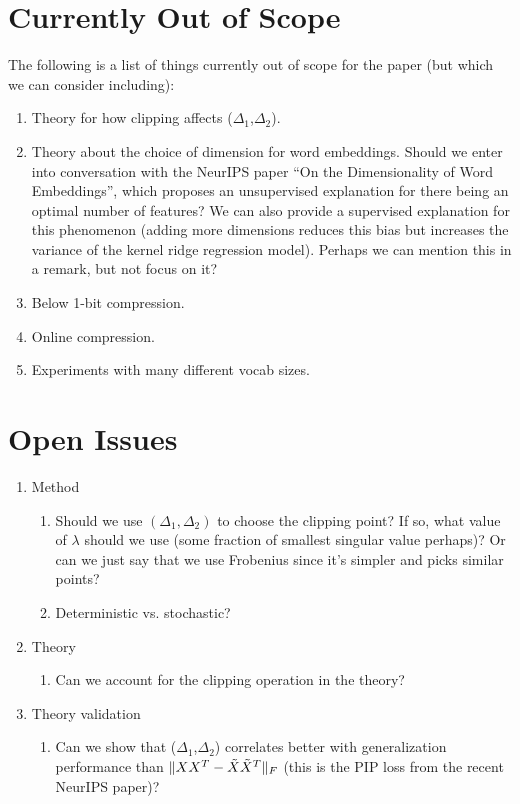 \documentclass[12pt]{article}
\begin{document}
\section{Currently Out of Scope}
The following is a list of things currently out of scope for the paper (but which we can consider including):
\begin{enumerate}
	\item Theory for how clipping affects ($\Delta_1$,$\Delta_2$).
	\item Theory about the choice of dimension for word embeddings. Should we enter into conversation with the NeurIPS paper ``On the Dimensionality of Word Embeddings'', which proposes an unsupervised explanation for there being an optimal number of features?
	We can also provide a supervised explanation for this phenomenon (adding more dimensions reduces this bias but increases the variance of the kernel ridge regression model).  Perhaps we can mention this in a remark, but not focus on it?
	\item Below 1-bit compression.
	\item Online compression.
	\item Experiments with many different vocab sizes.
\end{enumerate}

\section{Open Issues}
\begin{enumerate}
	\item Method
	\begin{enumerate}
		\item Should we use $(\Delta_1,\Delta_2)$ to choose the clipping point? If so, what value of $\lambda$ should we use (some fraction of smallest singular value perhaps)? Or can we just say that we use Frobenius since it's simpler and picks similar points?
		\item Deterministic vs. stochastic?
	\end{enumerate}
	\item Theory
	\begin{enumerate}
		\item Can we account for the clipping operation in the theory?
	\end{enumerate}
	\item Theory validation
	\begin{enumerate}
		\item Can we show that ($\Delta_1$,$\Delta_2$) correlates better with generalization performance than $\|XX^T - \tX \tX^T\|_F$ (this is the PIP loss from the recent NeurIPS paper)?
	\end{enumerate}
\end{enumerate}
\end{document}
